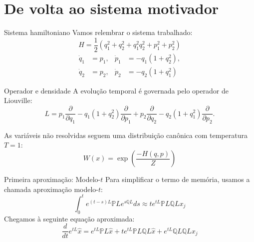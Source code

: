 \section{De volta ao sistema motivador}

\begin{frame}{Sistema hamiltoniano}
	Vamos relembrar o sistema trabalhado:
	\begin{equation*}
		H = \frac{1}{2}(q_1^2 + q_2^2 + q_1^2 q_2^2 + p_1^2 + p_2^2)
	\end{equation*}
	\begin{align*}
		\dot{q}_1 & = p_1, & \dot{p}_1 & = -q_1(1 + q_2^2), \\
		\dot{q}_2 & = p_2, & \dot{p}_2 & = -q_2(1 + q_1^2)  
	\end{align*}
\end{frame}

\begin{frame}{Operador e densidade}
	A evolução temporal é governada pelo operador de Liouville:
    \begin{equation*}
        L = p_1 \frac{\partial}{\partial q_1} - q_1(1 + q_2^2)\frac{\partial}{\partial p_1} + p_2 \frac{\partial}{\partial q_2} - q_2(1 + q_1^2)\frac{\partial}{\partial p_2}.
    \end{equation*}

	As variáveis não resolvidas seguem uma distribuição canônica com temperatura $T=1$:
	\begin{equation*}
		W(x) = \exp\left(\frac{-H(q,p)}{Z}\right)
	\end{equation*}
\end{frame}

\begin{frame}{Primeira aproximação: Modelo-$t$}
	Para simplificar o termo de memória, usamos a chamada aproximação modelo-$t$:
	\begin{equation*}
		\int_0^t e^{(t-s)L} \mathbb{P}L e^{s \mathbb{Q}L} ds \approx t e^{tL} \mathbb{P}L \mathbb{Q}L x_j
	\end{equation*}
	Chegamos à seguinte equação aproximada:
	\begin{equation*}
		\frac{d}{dt} e^{tL} \hat{x} = e^{tL} \mathbb{P}L \hat{x} + t e^{tL} \mathbb{P}L \mathbb{Q}L \hat{x} + e^{tL} \mathbb{Q}L \mathbb{Q}L x_j
	\end{equation*}
\end{frame}

